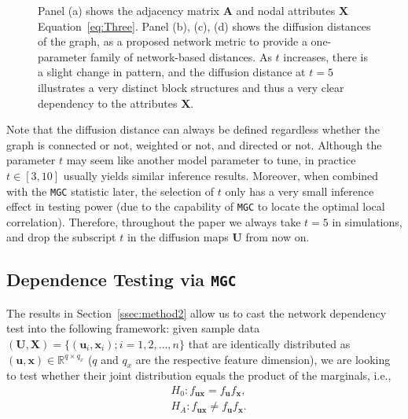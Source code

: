 \documentclass[11pt]{article}
\theoremstyle{definition}
\begin{document}
\begin{figure}[ht]
\begin{subfigure}[b]{0.23\textwidth}
		\caption{}
		\label{fig:d}
	\end{subfigure}
	\caption{Panel (a) shows the adjacency matrix $\mathbf{A}$ and nodal attributes $\mathbf{X}$ Equation~\ref{eq:Three}. Panel (b), (c), (d) shows the diffusion distances of the graph, as a proposed network metric to provide a one-parameter family of network-based distances. As $t$ increases, there is a slight change in pattern, and the diffusion distance at $t = 5$ illustrates a very distinct block structures and thus a very clear dependency to the attributes $\mathbf{X}$.}
	\label{fig:diffusions}
\end{figure}

\vspace*{-0.4cm}
Note that the diffusion distance can always be defined regardless whether the graph is connected or not, weighted or not, and directed or not. Although the parameter $t$ may seem like another model parameter to tune, in practice $t \in [3,10]$ usually yields similar inference results. Moreover, when combined with the \texttt{MGC} statistic later, the selection of $t$ only has a very small inference effect in testing power (due to the capability of \texttt{MGC} to locate the optimal local correlation). Therefore, throughout the paper we always take $t=5$ in simulations, and drop the subscript $t$ in the diffusion maps $\mathbf{U}$ from now on. 

\subsection{Dependence Testing via \texttt{MGC}}
\label{ssec:method1}
The results in Section~\ref{ssec:method2} allow us to cast the network dependency test into the following framework: given sample data $(\mathbf{U}, \mathbf{X}) = \{  (\mathbf{u}_{i}, \mathbf{x}_{i} ) ; i = 1,2, \ldots, n \}$ that are identically distributed as $(\mathbf{u},\mathbf{x}) \in \mathbb{R}^{q \times q_x}$ ($q$ and $q_x$ are the respective feature dimension), we are looking to test whether their joint distribution equals the product of the marginals, i.e.,
\begin{align*}
& H_{0}: f_{\mathbf{u}\mathbf{x}}=f_{\mathbf{u}}f_{\mathbf{x}},\\
& H_{A}: f_{\mathbf{u}\mathbf{x}}\neq f_{\mathbf{u}}f_{\mathbf{x}}.
\end{align*}
\end{document}
